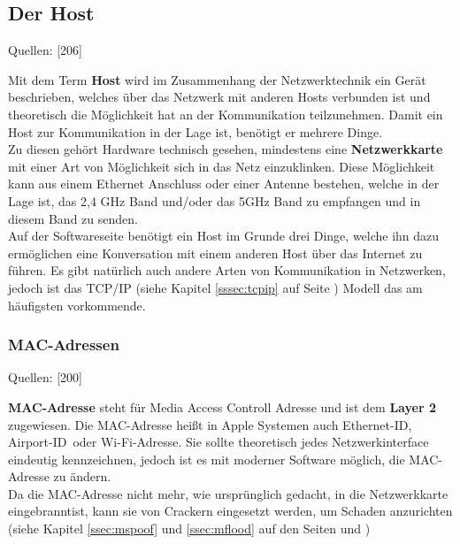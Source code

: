 \documentclass[12pt,a4paper]{report}
\begin{document}
\begin{onehalfspace}
\subsection{Der Host}
\begin{flushright}
\begin{tiny}
Quellen: [206]
\end{tiny}
\end{flushright}
Mit dem Term \textbf{Host} wird im Zusammenhang der Netzwerktechnik ein Gerät beschrieben, welches über das Netzwerk mit anderen Hosts verbunden ist und theoretisch die Möglichkeit hat an der Kommunikation teilzunehmen. Damit ein Host zur Kommunikation in der Lage ist, benötigt er mehrere Dinge.\\
Zu diesen gehört Hardware technisch gesehen, mindestens eine \textbf{Netzwerkkarte} mit einer Art von Möglichkeit sich in das Netz einzuklinken. Diese Möglichkeit kann aus einem Ethernet Anschluss oder einer Antenne bestehen, welche in der Lage ist, das 2,4 GHz Band und/oder das 5GHz Band zu empfangen und in diesem Band zu senden.\\
Auf der Softwareseite benötigt ein Host im Grunde drei Dinge, welche ihn dazu ermöglichen eine Konversation mit einem anderen Host über das Internet zu führen. Es gibt natürlich auch andere Arten von Kommunikation in Netzwerken, jedoch ist das TCP/IP (siehe Kapitel \ref{sssec:tcpip} auf Seite \pageref{sssec:tcpip}) Modell das am häufigsten vorkommende. 

\subsubsection{MAC-Adressen}\label{sssec:macaddr}
\begin{flushright}
\begin{tiny}
Quellen: [200]
\end{tiny}
\end{flushright}
\textbf{MAC-Adresse} steht für Media Access Controll Adresse und ist dem \textbf{Layer 2} zugewiesen. Die MAC-Adresse heißt in Apple Systemen auch \glqq Ethernet-ID\grqq , \glqq Airport-ID\grqq \ oder \glqq Wi-Fi-Adresse\grqq . Sie sollte theoretisch jedes Netzwerkinterface eindeutig kennzeichnen, jedoch ist es mit moderner Software möglich, die MAC-Adresse zu ändern.\\
Da die MAC-Adresse nicht mehr, wie ursprünglich gedacht, in die Netzwerkkarte \glqq eingebrannt\grqq ist, kann sie von Crackern eingesetzt werden, um Schaden anzurichten (siehe Kapitel \ref{ssec:mspoof} und \ref{ssec:mflood} auf den Seiten \pageref{ssec:mspoof} und \pageref{ssec:mflood})\\


\end{onehalfspace}
\end{document}
